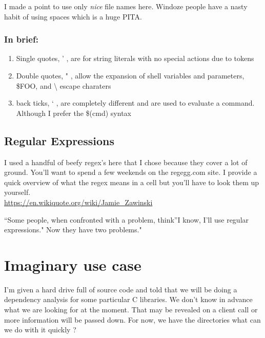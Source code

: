 \documentclass{article}
\begin{document}
I made a point to use only \emph{nice} file names here. Windoze people
have a nasty habit of using spaces which is a huge PITA.

\subsubsection{In brief:}\label{in-brief}

\begin{enumerate}
\def\labelenumi{\arabic{enumi}.}
\itemsep1pt\parskip0pt
\item
  Single quotes, ' , are for string literals with no special actions due
  to tokens
\item
  Double quotes, " , allow the expansion of shell variables and
  parameters, \$FOO, and \textbackslash{} escape charaters
\item
  back ticks, ` , are completely different and are used to evaluate a
  command. Although I prefer the \$(cmd) syntax
\end{enumerate}

\subsection{Regular Expressions}\label{regular-expressions}

I used a handful of beefy regex's here that I chose because they cover a
lot of ground. You'll want to spend a few weekends on the regegg.com
site. I provide a quick overview of what the regex means in a cell but
you'll have to look them up yourself. \\

\url{https://en.wikiquote.org/wiki/Jamie\_Zawinski}

``Some people, when confronted with a problem, think''I know, I'll use
regular expressions." Now they have two problems."

    \section{Imaginary use case}\label{imaginary-use-case}

I'm given a hard drive full of source code and told that we will be
doing a dependency analysis for some particular C libraries. We don't
know in advance what we are looking for at the moment. That may be
revealed on a client call or more information will be passed down. For
now, we have the directories what can we do with it quickly ? \\
\end{document}
